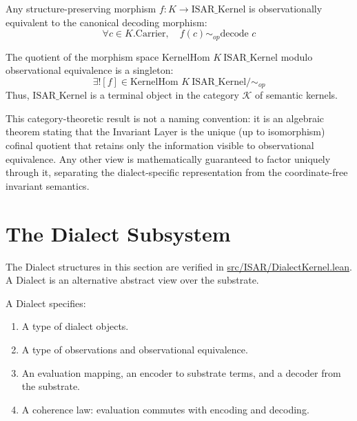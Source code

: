 \begin{theorem}
Any structure-preserving morphism $f : K \to \text{ISAR\_Kernel}$ is observationally equivalent to the canonical decoding morphism:
$$\forall c \in K.\text{Carrier}, \quad f(c) \sim_{op} \text{decode } c$$
\end{theorem}

\begin{theorem}
The quotient of the morphism space $\text{KernelHom } K\ \text{ISAR\_Kernel}$ modulo observational equivalence is a singleton:
$$\exists! [f] \in \text{KernelHom } K\ \text{ISAR\_Kernel} / \sim_{op}$$
Thus, $\text{ISAR\_Kernel}$ is a terminal object in the category $\mathcal{K}$ of semantic kernels.
\end{theorem}

This category-theoretic result is not a naming convention: it is an algebraic theorem stating that the Invariant Layer is the unique (up to isomorphism) cofinal quotient that retains only the information visible to observational equivalence. Any other view is mathematically guaranteed to factor uniquely through it, separating the dialect-specific representation from the coordinate-free invariant semantics.

\section{The Dialect Subsystem}

The Dialect structures in this section are verified in \url{src/ISAR/DialectKernel.lean}. A Dialect is an alternative abstract view over the substrate.

\begin{definition}[Dialect]
A Dialect specifies:
\begin{enumerate}
    \item A type of dialect objects.
    \item A type of observations and observational equivalence.
    \item An evaluation mapping, an encoder to substrate terms, and a decoder from the substrate.
    \item A coherence law: evaluation commutes with encoding and decoding.
\end{enumerate}
\end{definition}
